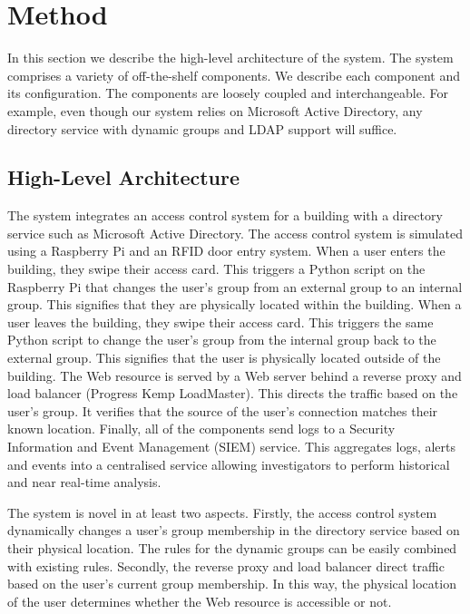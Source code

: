 \section{Method}\label{sec:method}

In this section we describe the high-level architecture of the system.
The system comprises a variety of off-the-shelf components.  We
describe each component and its configuration.  The components are
loosely coupled and interchangeable.  For example, even though our
system relies on Microsoft Active Directory, any directory service
with dynamic groups and LDAP support will suffice.

\subsection{High-Level Architecture}

The system integrates an access control system for a building with a
directory service such as Microsoft Active Directory.  The access
control system is simulated using a Raspberry Pi and an RFID door
entry system.  When a user enters the building, they swipe their
access card.  This triggers a Python script on the Raspberry Pi that
changes the user's group from an external group to an internal group.
This signifies that they are physically located within the building.
When a user leaves the building, they swipe their access card.  This
triggers the same Python script to change the user's group from the
internal group back to the external group.  This signifies that the
user is physically located outside of the building.  The Web resource
is served by a Web server behind a reverse proxy and load balancer
(Progress Kemp LoadMaster).  This directs the traffic based on the
user's group.  It verifies that the source of the user's connection
matches their known location.  Finally, all of the components send
logs to a Security Information and Event Management (SIEM) service.
This aggregates logs, alerts and events into a centralised service
allowing investigators to perform historical and near real-time
analysis.

The system is novel in at least two aspects.  Firstly, the access
control system dynamically changes a user's group membership in the
directory service based on their physical location.  The rules for the
dynamic groups can be easily combined with existing rules.  Secondly,
the reverse proxy and load balancer direct traffic based on the user's
current group membership.  In this way, the physical location of the
user determines whether the Web resource is accessible or not.

